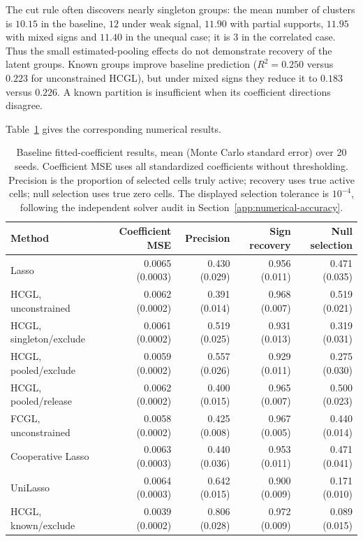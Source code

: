 \documentclass[11pt,a4paper]{article}
\begin{document}
The cut rule often discovers nearly singleton groups: the mean number
of clusters is $10.15$ in the baseline, $12$ under weak signal, $11.90$
with partial supports, $11.95$ with mixed signs and $11.40$ in the unequal
case; it is $3$ in the correlated case. Thus the small estimated-pooling
effects do not demonstrate recovery of the latent groups. Known groups
improve baseline prediction ($R^2=0.250$ versus $0.223$ for unconstrained
HCGL), but under mixed signs they reduce it to $0.183$ versus $0.226$.
A known partition is insufficient when its coefficient directions disagree.

\noindent Table~\ref{tab:fitted-support} gives the corresponding numerical results.

\begin{table}[htbp]\centering\small\setlength{\tabcolsep}{3pt}
\caption{Baseline fitted-coefficient results, mean (Monte Carlo standard
error) over 20 seeds. Coefficient MSE uses all standardized coefficients
without thresholding. Precision is the proportion of selected cells truly
active; recovery uses true active cells; null selection uses true zero cells.
The displayed selection tolerance is $10^{-4}$, following the independent solver audit in Section~\ref{app:numerical-accuracy}.}
\label{tab:fitted-support}
\begin{tabular}{lrrrr}\toprule
Method & Coefficient MSE & Precision & Sign recovery & Null selection\\\midrule
Lasso & 0.0065 (0.0003) & 0.430 (0.029) & 0.956 (0.011) & 0.471 (0.035) \\
HCGL, unconstrained & 0.0062 (0.0002) & 0.391 (0.014) & 0.968 (0.007) & 0.519 (0.021) \\
HCGL, singleton/exclude & 0.0061 (0.0002) & 0.519 (0.025) & 0.931 (0.013) & 0.319 (0.031) \\
HCGL, pooled/exclude & 0.0059 (0.0002) & 0.557 (0.026) & 0.929 (0.011) & 0.275 (0.030) \\
HCGL, pooled/release & 0.0062 (0.0002) & 0.400 (0.015) & 0.965 (0.007) & 0.500 (0.023) \\
FCGL, unconstrained & 0.0058 (0.0002) & 0.425 (0.008) & 0.967 (0.005) & 0.440 (0.014) \\
Cooperative Lasso & 0.0063 (0.0003) & 0.440 (0.036) & 0.953 (0.011) & 0.471 (0.041) \\
UniLasso & 0.0064 (0.0003) & 0.642 (0.015) & 0.900 (0.009) & 0.171 (0.010) \\
HCGL, known/exclude & 0.0039 (0.0002) & 0.806 (0.028) & 0.972 (0.009) & 0.089 (0.015) \\
\bottomrule\end{tabular}
\end{table}
\end{document}
